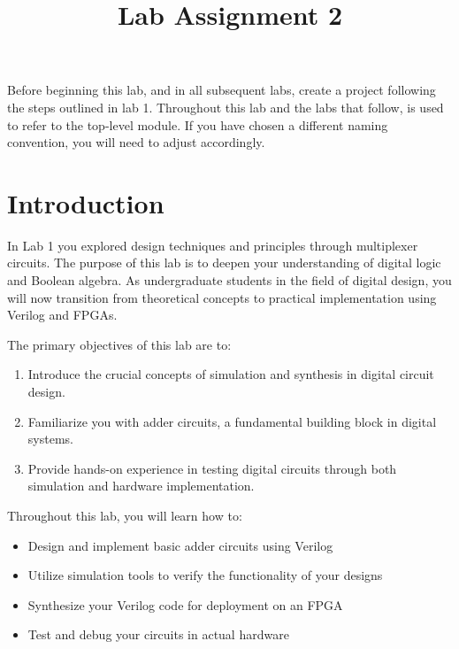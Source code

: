 \documentclass[12pt]{labmanual}
\title{Lab Assignment 2 }
\author{}
\date{}
\begin{document}
\captionsetup{tablewithin=section}
\maketitle
\begin{important}[frametitle={Create a project}]
Before beginning this lab, and in all subsequent labs, create a project following the steps outlined in lab 1. Throughout this lab and the labs that follow,  is used to refer to the top-level module. If you have chosen a different naming convention, you will need to adjust accordingly.
\end{important}

\section{Introduction}

In Lab 1 you explored design techniques and principles through multiplexer circuits. The purpose of this lab is to deepen your understanding of digital logic and Boolean algebra. As undergraduate students in the field of digital design, you will now transition from theoretical concepts to practical implementation using Verilog and FPGAs.

The primary objectives of this lab are to:
\begin{enumerate}
    \item Introduce the crucial concepts of simulation and synthesis in digital circuit design.
    \item Familiarize you with adder circuits, a fundamental building block in digital systems.
    \item Provide hands-on experience in testing digital circuits through both simulation and hardware implementation.
\end{enumerate}



Throughout this lab, you will learn how to:

\begin{itemize}
\item Design and implement basic adder circuits using Verilog
\item Utilize simulation tools to verify the functionality of your designs
\item Synthesize your Verilog code for deployment on an FPGA
\item Test and debug your circuits in actual hardware
\end{itemize}
\end{document}
